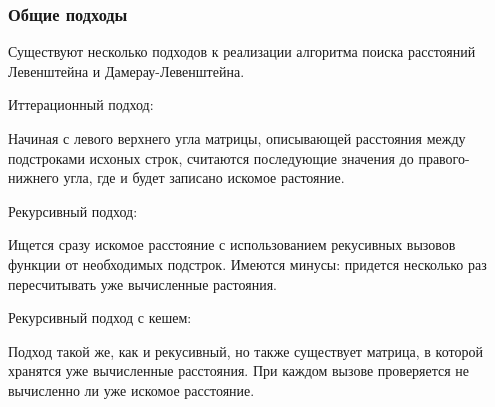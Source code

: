 \subsubsection{Общие подходы}
Существуют несколько подходов к реализации алгоритма поиска расстояний Левенштейна и Дамерау-Левенштейна.\par
Иттерационный подход:\par
Начиная с левого верхнего угла матрицы, описывающей расстояния между подстроками исхоных строк, 
считаются последующие значения до правого-нижнего угла, где и будет записано искомое растояние.\par
Рекурсивный подход:\par
Ищется сразу искомое расстояние с использованием рекусивных вызовов функции от необходимых подстрок.
Имеются минусы: придется несколько раз пересчитывать уже вычисленные растояния.\par
Рекурсивный подход с кешем:\par
Подход такой же, как и рекусивный, но также существует матрица, в которой хранятся уже вычисленные расстояния.
При каждом вызове проверяется не вычисленно ли уже искомое расстояние.




\pagebreak